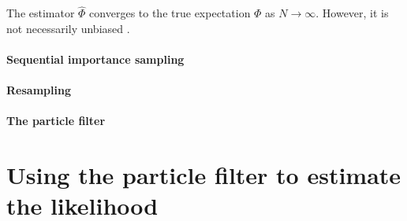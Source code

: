 The estimator $\widehat{\Phi}$ converges to the true expectation $\Phi$ as $N \to \infty$. However, it is not necessarily unbiased \citep{information-theory}.


\paragraph{Sequential importance sampling}

\paragraph{Resampling}

\paragraph{The particle filter}



\section{Using the particle filter to estimate the likelihood} \label{sec:particle-filter-estimate}